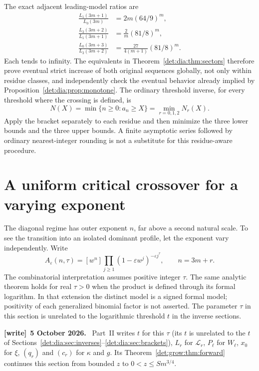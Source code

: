 \documentclass[11pt,letterpaper]{article}
\numberwithin{equation}{section}
\theoremstyle{definition}\newtheorem{definition}[theorem]{Definition}
\theoremstyle{remark}\newtheorem{remark}[theorem]{Remark}
\newcommand{\eps}{\varepsilon}
\newcommand{\coef}[2]{[#1^{#2}]}
\newenvironment{writenote}[1][]{\par\smallskip\begingroup\small
 \noindent\textbf{[write]}\if\relax\detokenize{#1}\relax\else~\textbf{#1.}\fi\ }%
 {\par\endgroup\smallskip}
\begin{document}
The exact adjacent leading-model ratios are
\begin{equation}\label{det:dia:eq:ratios}
\begin{aligned}
 \frac{L_1(3m+1)}{L_0(3m)}&=2m(64/9)^m,\\
 \frac{L_2(3m+2)}{L_1(3m+1)}&=\frac2m(81/8)^m,\\
 \frac{L_0(3m+3)}{L_2(3m+2)}&=\frac{27}{4(m+1)}(81/8)^m.
\end{aligned}
\end{equation}
Each tends to infinity. The equivalents in
Theorem~\ref{det:dia:thm:sectors} therefore prove eventual strict increase of
both original sequences globally, not only within residue classes,
and independently check the eventual behavior already implied by
Proposition~\ref{det:dia:prop:monotone}.
The ordinary threshold inverse, for every threshold where the crossing
is defined, is
\begin{equation}\label{det:dia:eq:globalinverse}
 N(X)=\min\{n\geq0:a_n\geq X\}=\min_{r=0,1,2}N_r(X).
\end{equation}
Apply the bracket separately to each residue and then minimize the
three lower bounds and the three upper bounds. A finite asymptotic
series followed by ordinary nearest-integer rounding is not a substitute
for this residue-aware procedure.

\section{A uniform critical crossover for a varying exponent}\label{det:dia:sec:crossover}
The diagonal regime has outer exponent $n$, far above a second natural
scale. To see the transition into an isolated dominant profile, let the
exponent vary independently. Write
\begin{equation}\label{det:dia:eq:twoparam}
 A_\eps(n,\tau)=\coef{w}{n}
 \prod_{j\geq1}(1-\eps w^j)^{-\eps j^\tau},\qquad n=3m+r.
\end{equation}
The combinatorial interpretation assumes positive integer $\tau$.
The same analytic theorem holds for real $\tau>0$ when the product is
defined through its formal logarithm. In that extension the distinct
model is a signed formal model; positivity of each generalized binomial
factor is not asserted. The parameter $\tau$ in this section is unrelated
to the logarithmic threshold $t$ in the inverse sections.
\begin{writenote}[5 October 2026]
Part~II writes $t$ for this $\tau$ (its $t$ is unrelated to the $t$ of Sections~\ref{det:dia:sec:inverses}--\ref{det:dia:sec:brackets}), $L_r$ for $\mathcal L_r$, $P_\ell$ for $W_\ell$, $x_0$ for $\xi$, $(q_r)$ and $(c_r)$ for $\kappa$ and $g$. Its Theorem~\ref{det:grow:thm:forward} continues this section from bounded $z$ to $0<z\le Sm^{3/4}$.
\end{writenote}
\end{document}
